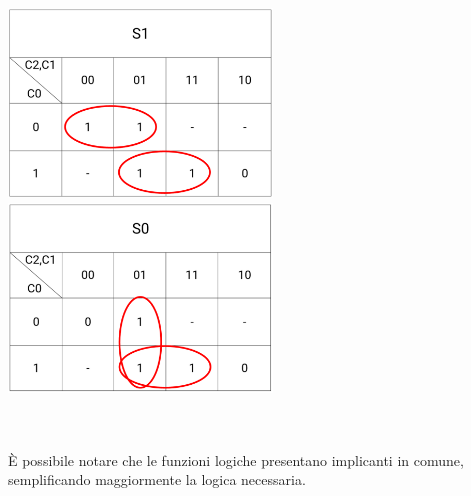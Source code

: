 \documentclass[11pt,  english, makeidx, a4paper, titlepage, oneside]{book}
\begin{document}
\\\\
\centerline{\includegraphics[width=7cm]{./img/Lab_2/K_S1.png}
			\includegraphics[width=7cm]{./img/Lab_2/K_S0.png}}
\\\\
È possibile notare che le funzioni logiche presentano implicanti in comune, semplificando maggiormente la logica necessaria.
\\
\end{document}
